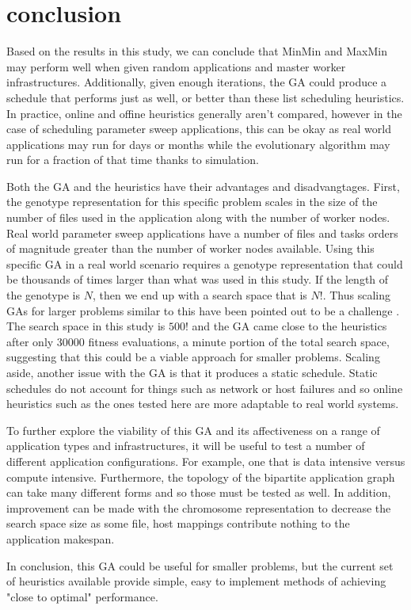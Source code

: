 \section{conclusion}
\label{sec:conclusion}
Based on the results in this study, we can conclude that MinMin and MaxMin
may perform well when given random applications and master worker
infrastructures. Additionally, given enough iterations, the GA could
produce a schedule that performs just as well, or better than these
list scheduling heuristics. In practice, online and offine heuristics
generally aren't compared, however in the case of scheduling parameter
sweep applications, this can be okay as real world applications may run
for days or months while the evolutionary algorithm may run for a fraction
of that time thanks to simulation.

Both the GA and the heuristics have their advantages and disadvangtages. First,
the genotype representation for this specific problem scales in the size of
the number of files used in the application along with the number of worker
nodes. Real world parameter sweep applications have a number of files and tasks
orders of magnitude greater than the number of worker nodes available. Using
this specific GA in a real world scenario requires a genotype representation
that could be thousands of times larger than what was used in this study.
If the length of the genotype is $N$, then we end up with a search space
that is $N!$. Thus scaling GAs for larger problems similar to this have
been pointed out to be a challenge \cite{wu-incremental-genetic-04}. The search
space in this study is $500!$ and the GA came close to the heuristics after
only 30000 fitness evaluations, a minute portion of the total search space,
suggesting that this could be a viable approach for smaller problems. Scaling
aside, another issue with the GA is that it produces a static schedule. Static
schedules do not account for things such as network or host failures and so
online heuristics such as the ones tested here are more adaptable to real
world systems.

To further explore the viability of this GA and its affectiveness on a range
of application types and infrastructures, it will be useful to test a number
of different application configurations. For example, one that is data intensive
versus compute intensive. Furthermore, the topology of the bipartite application
graph can take many different forms and so those must be tested as well.
In addition, improvement can be made with the chromosome representation
to decrease the search space size as some file, host mappings contribute
nothing to the application makespan.

In conclusion, this GA could be useful for smaller problems, but the
current set of heuristics available provide simple, easy to implement
methods of achieving "close to optimal" performance.  

